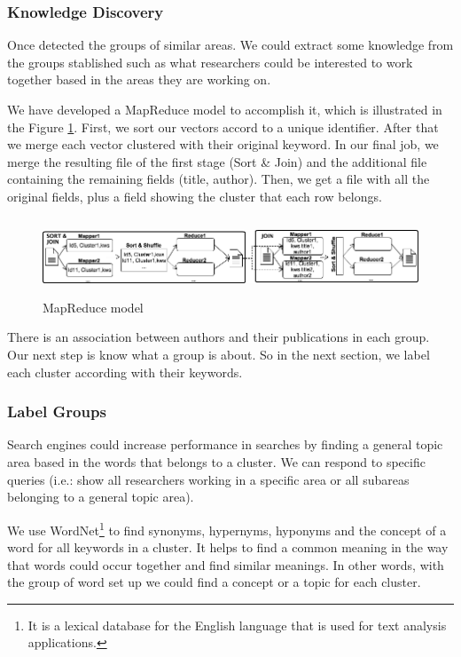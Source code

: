 \documentclass[11pt]{article}
\begin{document}
\subsubsection{Knowledge Discovery}

Once detected the groups of similar areas. We could extract some knowledge from the groups stablished such as what researchers could be interested to work together based in the areas they are working on. 

We have developed a MapReduce model to accomplish it, which is illustrated %
in the Figure \ref{fig:mapreducemodel}. First, we sort our vectors accord to a unique identifier. After that we merge each vector clustered with their original keyword. In our final job, we merge the resulting file of the first stage (Sort \& Join) and the additional file containing the remaining fields (title, author). Then, we get a file with all the original fields, plus a field showing the cluster that each row belongs.

\begin{figure}[ht!]
	\centering
		\includegraphics[height=2.295cm]{findka.png}
	\caption{MapReduce model}
	\label{fig:mapreducemodel}
\end{figure}

There is an association between authors and their publications in each group. Our next step is know what a group is about. So in the next section, we label each cluster according with their keywords.

\subsubsection{Label Groups}

Search engines could increase performance in searches by finding a general topic area based in the words that belongs to a cluster. We can respond to specific queries (i.e.: show all researchers working in a specific area or all subareas belonging to a general topic area).

We use WordNet\footnote{It is a lexical database for the English language that is used for text analysis applications.} \cite{Miller} to find synonyms, hypernyms, hyponyms and the concept of a word for all keywords in a cluster. It helps to find a common meaning in the way that words could occur together and find similar meanings. In other words, with the group of word set up we could find a concept or a topic for each cluster.
\end{document}
